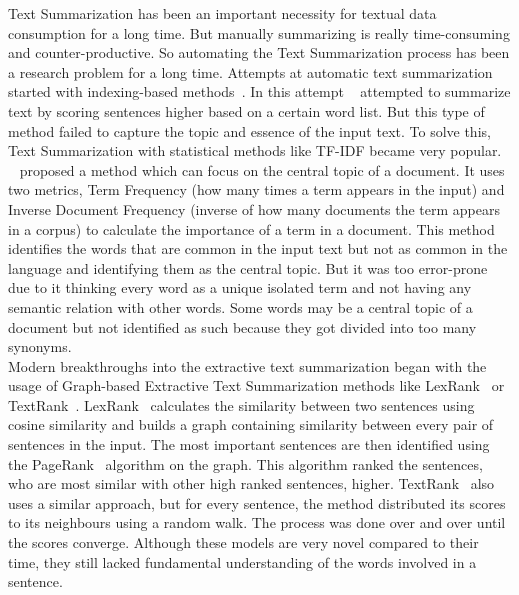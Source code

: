 Text Summarization has been an important necessity for textual data consumption for a long time.
But manually summarizing is really time-consuming and counter-productive.
So automating the Text Summarization process has been a research problem for a long time.
Attempts at automatic text summarization started with indexing-based methods~\cite{Baxendale_1958_firstsummarization}.
In this attempt \citeauthor{Baxendale_1958_firstsummarization}~\cite{Baxendale_1958_firstsummarization} attempted to
summarize text by scoring sentences higher based on a certain word list.
But this type of method failed to capture the topic and essence of the input text.
To solve this, Text Summarization with statistical methods like TF-IDF became very popular.
\citeauthor{edmundson_1969_earlysum}~\cite{edmundson_1969_earlysum} proposed a method which can focus on the central topic of a document.
It uses two metrics, Term Frequency (how many times a term appears in the input) and Inverse Document Frequency
(inverse of how many documents the term appears in a corpus) to calculate the importance of a term in a document.
This method identifies the words that are common in the input text but not as common in the language and identifying
them as the central topic.
But it was too error-prone due to it thinking every word as a unique isolated term and not having
any semantic relation with other words.
Some words may be a central topic of a document but not identified as such because they got divided into too many
synonyms. \\

Modern breakthroughs into the extractive text summarization began with the usage of Graph-based Extractive
Text Summarization methods like LexRank~\cite{Erkan-lexRank-2004} or TextRank~\cite{mihalcea-2004-textrank}.
LexRank~\cite{Erkan-lexRank-2004} calculates the similarity between two sentences using cosine similarity
and builds a graph
containing similarity between every pair of sentences in the input.
The most important sentences are then identified using the PageRank~\cite{page-PageRank-1999} algorithm on the graph.
This algorithm ranked the sentences, who are most similar with other high ranked sentences, higher.
TextRank~\cite{mihalcea-2004-textrank} also uses a similar approach,
but for every sentence, the method distributed its scores to its neighbours using a random walk.
The process was done over and over until the scores converge.
Although these models are very novel compared to their time, they still lacked fundamental understanding of the
words involved in a sentence.\\

